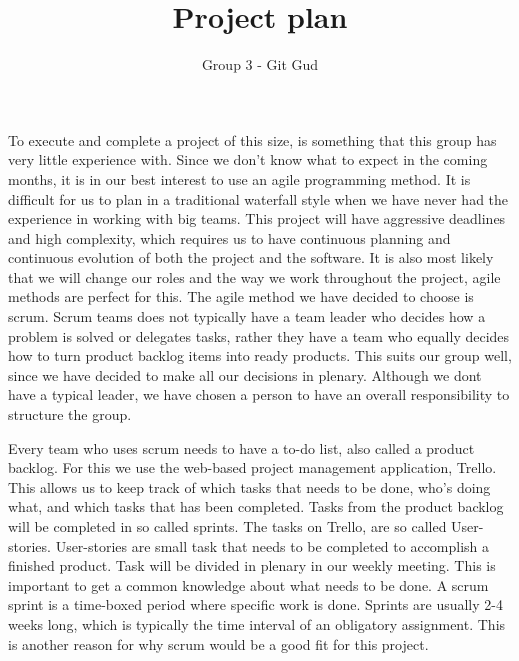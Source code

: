 \documentclass{article}
\begin{document}
\title{Project plan }
\author{Group 3 - Git Gud}

\maketitle


\raggedright

To execute and complete a project of this size, is something that this group has very little experience with. Since we don't know what to expect in the coming months, it is in our best interest to use an agile programming method. It is difficult for us to plan in a traditional waterfall style when we have never had the experience in working with big teams. This project will have aggressive deadlines and high complexity, which requires us to have continuous planning and continuous evolution of both the project and the software. It is also most likely that we will change our roles and the way we work throughout the project, agile methods are perfect for this. \newline
\newline
The agile method we have decided to choose is scrum. Scrum teams does not typically have a team leader who decides how a problem is solved or delegates tasks, rather they have a team who equally decides how to turn product backlog items into ready products. This suits our group well, since we have decided to make all our decisions in plenary. Although we dont have a typical leader, we have chosen a person to have an overall responsibility to structure the group. \newline

Every team who uses scrum needs to have a to-do list, also called a product backlog. For this we use the web-based project management application, Trello. This allows us to keep track of which tasks that needs to be done, who's doing what, and which tasks that has been completed. Tasks from the product backlog will be completed in so called sprints. The tasks on Trello, are so called User-stories. User-stories are small task that needs to be completed to accomplish a finished product. Task will be divided in plenary in our weekly meeting. This is important  to get a common knowledge about what needs to be done. A scrum sprint is a time-boxed period where specific work is done. Sprints are usually 2-4 weeks long, which is typically the time interval of an obligatory assignment. This is another reason for why scrum would be a good fit for this project. \newline
\end{document}
